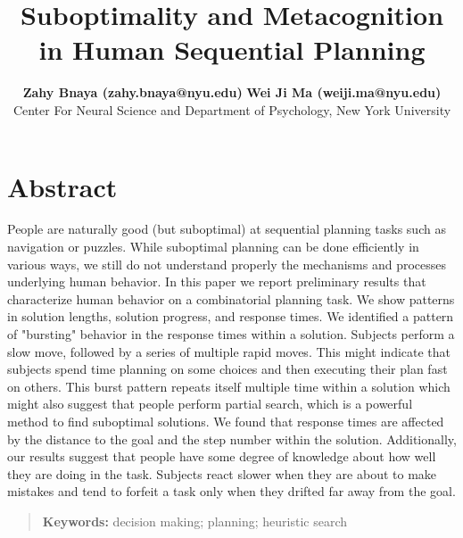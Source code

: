 \documentclass[10pt,letterpaper]{article}
\title{Suboptimality and Metacognition in Human Sequential Planning}
\author{{\large \bf Zahy Bnaya (zahy.bnaya@nyu.edu)} {\large \bf Wei Ji Ma (weiji.ma@nyu.edu)} \\
Center For Neural Science and Department of Psychology, New York University\\
}
\begin{document}
\maketitle

\section{Abstract} {\bf
 
People are naturally good (but suboptimal) at sequential planning tasks such as navigation or puzzles. While suboptimal planning can be done efficiently in various ways, we still do not understand properly the mechanisms and processes underlying human behavior. In this paper we report preliminary results that characterize human behavior on a combinatorial planning task. We show patterns in solution lengths, solution progress, and response times. We identified a pattern of "bursting" behavior in the response times within a solution. Subjects perform a slow move, followed by a series of multiple rapid moves. This might indicate that subjects spend time planning on some choices and then executing their plan fast on others. This burst pattern repeats itself multiple time within a solution which might also suggest that people perform partial search, which is a powerful method to find suboptimal solutions. We found that response times are affected by the distance to the goal and the step number within the solution. Additionally, our results suggest that people have some degree of knowledge about how well they are doing in the task. Subjects react slower when they are about to make mistakes and tend to forfeit a task only when they drifted far away from the goal. 



}

\begin{quote}
\small
\textbf{Keywords:} 
decision making; planning; heuristic search
\end{quote}
\end{document}
